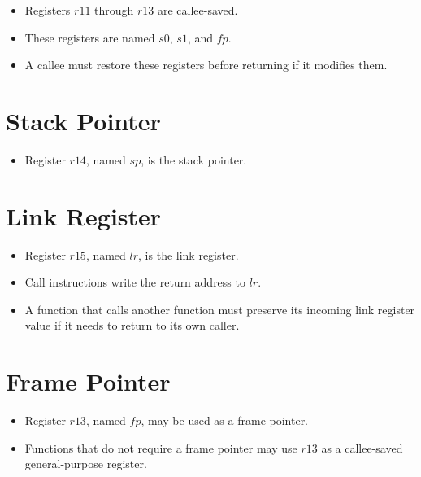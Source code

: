 \begin{itemize}
  \item Registers \(r11\) through \(r13\) are callee-saved.
  \item These registers are named \(s0\), \(s1\), and \(fp\).
  \item A callee must restore these registers before returning if it modifies them.
\end{itemize}

\section{Stack Pointer}

\begin{itemize}
  \item Register \(r14\), named \(sp\), is the stack pointer.
\end{itemize}

\section{Link Register}

\begin{itemize}
  \item Register \(r15\), named \(lr\), is the link register.
  \item Call instructions write the return address to \(lr\).
  \item A function that calls another function must preserve its incoming link register value if it needs to return to its own caller.
\end{itemize}

\section{Frame Pointer}

\begin{itemize}
  \item Register \(r13\), named \(fp\), may be used as a frame pointer.
  \item Functions that do not require a frame pointer may use \(r13\) as a callee-saved general-purpose register.
\end{itemize}
